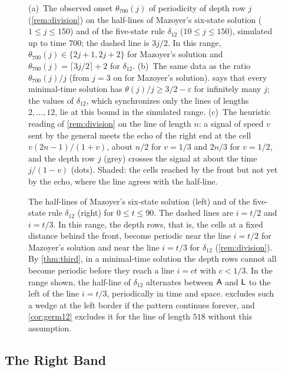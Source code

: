 \begin{figure}[t]
\centering

\caption{(a)~The observed onset $\theta_{700}(j)$ of periodicity of depth row
$j$ (\cref{rem:division}) on the half-lines of Mazoyer's six-state solution
($1\le j\le150$) and of the five-state rule $\delta_{12}$ ($10\le j\le150$),
simulated up to time $700$; the dashed line is $3j/2$. In this range,
$\theta_{700}(j)\in\{2j+1,2j+2\}$ for Mazoyer's solution and
$\theta_{700}(j)=\lceil 3j/2\rceil+2$ for $\delta_{12}$. (b)~The same data as
the ratio $\theta_{700}(j)/j$ (from $j=3$ on for Mazoyer's solution).
 says that every minimal-time solution has
$\theta(j)/j\ge3/2-\varepsilon$ for infinitely many $j$; the values of
$\delta_{12}$, which synchronizes only the lines of lengths $2,\dots,12$, lie at
this bound in the simulated range.
(c)~The heuristic reading of \cref{rem:division} on the line of length $n$: a signal of
speed $v$ sent by the general meets the echo of the right end at the cell
$v(2n-1)/(1+v)$, about $n/2$ for $v=1/3$ and $2n/3$ for $v=1/2$, and the depth
row $j$ (grey) crosses the signal at about the time $j/(1-v)$ (dots). Shaded:
the cells reached by the front but not yet by the echo, where the line agrees
with the half-line.}
\label{fig:theta}
\end{figure}

\begin{figure}[t]
\centering

\caption{The half-lines of Mazoyer's six-state solution (left) and of the
five-state rule $\delta_{12}$ (right) for $0\le t\le90$. The dashed lines are
$i=t/2$ and $i=t/3$. In this range, the depth rows, that is, the cells at a
fixed distance behind the front, become periodic near the line $i=t/2$ for
Mazoyer's solution and near the line $i=t/3$ for $\delta_{12}$
(\cref{rem:division}). By \cref{thm:third}, in a minimal-time solution the
depth rows cannot all become periodic before they reach a line $i=ct$ with
$c<1/3$. In the range shown, the half-line of $\delta_{12}$ alternates between
$\mathsf A$ and $\mathsf L$ to the left of the line $i=t/3$, periodically in time and
space.  excludes such a wedge at the left border if the pattern
continues forever, and \cref{cor:germ12} excludes it for the line of length
$518$ without this assumption.}
\label{fig:halflines}
\end{figure}

\subsection{The Right Band}

